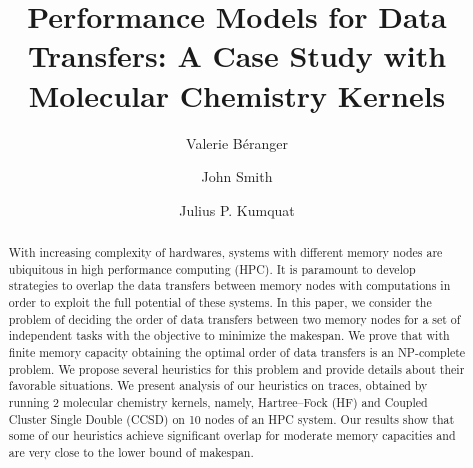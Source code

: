 \documentclass[sigconf]{acmart}
\begin{document}
	
	\title{Performance Models for Data Transfers: A Case Study with Molecular Chemistry Kernels}
	
	\author{Valerie B\'eranger}
	\author{John Smith}
	
	\author{Julius P. Kumquat}
	
	\renewcommand{\shortauthors}{Trovato and Tobin, et al.}
	
	\begin{abstract}
		With increasing complexity of hardwares, systems with different memory nodes are ubiquitous in high performance computing (HPC). It is paramount to develop strategies to overlap the data transfers between memory nodes with computations in order to exploit the full potential of these systems. In this paper, we consider the problem of deciding the order of data transfers between two memory nodes for a set of independent tasks with the objective to minimize the makespan. We prove that with finite memory capacity obtaining the optimal order of data transfers is an NP-complete problem. We propose several heuristics for this problem and provide details about their favorable situations. We present analysis of our heuristics on traces, obtained by running 2 molecular chemistry kernels, namely, Hartree–Fock (HF) and Coupled Cluster Single Double (CCSD) on 10 nodes of an HPC system. Our results show that some of our heuristics achieve significant overlap for moderate memory capacities and are very close to the lower bound of makespan.
	\end{abstract}
	
	
\end{document}
